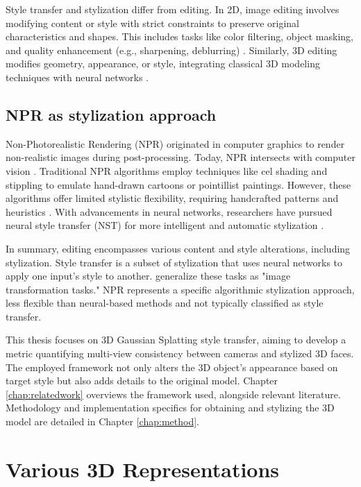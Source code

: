 Style transfer and stylization differ from editing. In 2D, image editing involves modifying content or style with strict constraints to preserve original characteristics and shapes. This includes tasks like color filtering, object masking, and quality enhancement (e.g., sharpening, deblurring) \citep{Jing.2020}. Similarly, 3D editing modifies geometry, appearance, or style, integrating classical 3D modeling techniques with neural networks \citep{Chen.2023}.

\subsection{NPR as stylization approach}

Non-Photorealistic Rendering (NPR) originated in computer graphics to render non-realistic images during post-processing. Today, NPR intersects with computer vision \citep{Rosin.2022}. Traditional NPR algorithms employ techniques like cel shading and stippling to emulate hand-drawn cartoons or pointillist paintings. However, these algorithms offer limited stylistic flexibility, requiring handcrafted patterns and heuristics \citep{Jing.2020}. With advancements in neural networks, researchers have pursued neural style transfer (NST) for more intelligent and automatic stylization \citep{Gatys.2015}.

In summary, editing encompasses various content and style alterations, including stylization. Style transfer is a subset of stylization that uses neural networks to apply one input's style to another. \Textcite{Johnson.2016} generalize these tasks as "image transformation tasks." NPR represents a specific algorithmic stylization approach, less flexible than neural-based methods and not typically classified as style transfer.

This thesis focuses on 3D Gaussian Splatting style transfer, aiming to develop a metric quantifying multi-view consistency between cameras and stylized 3D faces. The employed framework not only alters the 3D object's appearance based on target style but also adds details to the original model. Chapter \ref{chap:relatedwork} overviews the framework used, alongside relevant literature. Methodology and implementation specifics for obtaining and stylizing the 3D model are detailed in Chapter \ref{chap:method}.

\section{Various 3D Representations}

